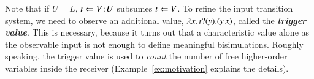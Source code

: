 Note that if $U=L$, $t \Leftarrow V \! : \! U$ subsumes 
$t \Leftarrow V$. 
To refine the input transition system, we need to observe 
an additional value, 
$\lambda {x}.\,t ? (y) . (y\, {{x}})$, 
called the {\bf\em trigger value}. 
This is necessary, because it turns out
that a characteristic value 
alone as the observable input 
is not enough to define meaningful bisimulations.
Roughly speaking, the trigger value is used 
to {\em count} the number of free higher-order variables inside 
the receiver (Example~\ref{ex:motivation} explains the details). 

